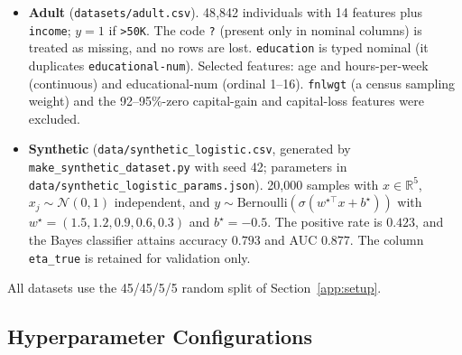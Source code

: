 \begin{itemize}
\begin{itemize}
  \end{itemize}
  \item \textbf{Adult} \cite{kohavi1996adult}
  (\texttt{datasets/adult.csv}).
  48{,}842 individuals with 14 features plus \texttt{income}; $y=1$ if
  \texttt{>50K}. The code \texttt{?} (present only in nominal columns) is
  treated as missing, and no rows are lost. \texttt{education} is typed nominal
  (it duplicates \texttt{educational-num}). Selected features: age and
  hours-per-week (continuous) and educational-num (ordinal 1--16).
  \texttt{fnlwgt} (a census sampling weight) and the 92--95\%-zero capital-gain
  and capital-loss features were excluded.
  \item \textbf{Synthetic}
  (\texttt{data/synthetic\_logistic.csv}, generated by
  \texttt{make\_synthetic\_dataset.py} with seed 42; parameters in
  \texttt{data/synthetic\_logistic\_params.json}).
  20{,}000 samples with $x\in\mathbb{R}^5$, $x_j\sim\mathcal{N}(0,1)$
  independent, and $y\sim\mathrm{Bernoulli}(\sigma(w^{\star\top}x+b^\star))$
  with $w^\star=(1.5,1.2,0.9,0.6,0.3)$ and $b^\star=-0.5$. The positive rate is
  $0.423$, and the Bayes classifier attains accuracy $0.793$ and AUC $0.877$.
  The column \texttt{eta\_true} is retained for validation only.
\end{itemize}
All datasets use the 45/45/5/5 random split of Section~\ref{app:setup}.

\subsection{Hyperparameter Configurations}
\label{app:hparams}

